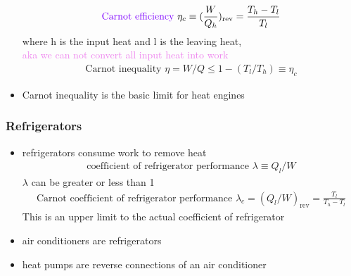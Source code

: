 \begin{itemize}
\begin{align}
		      \text{\textcolor{violet}{Carnot efficiency }} \eta_c \equiv (\frac{W}{Q_h})_\text{rev} = \frac{T_h - T_l}{T_l}
	      \end{align}
	      where h is the input heat and l is the leaving heat, \\
	      \textcolor{violet}{aka we can not convert all input heat into work}
	      \begin{align}
		      \text{Carnot inequality } \eta = W/Q \leq 1 - (T_l/T_h) \equiv \eta_c
	      \end{align}
	\item Carnot inequality is the basic limit for heat engines
\end{itemize}


\subsubsection{Refrigerators}
\begin{itemize}
	\item refrigerators consume work to remove heat
	      \begin{align}
		      \text{coefficient of refrigerator performance } \lambda \equiv Q_l /W
	      \end{align}
	      $\lambda$ can be greater or less than 1
	      \begin{align}
		      \text{Carnot coefficient of refrigerator performance } \lambda_c = (Q_l/W)_\text{rev} = \frac{T_l}{T_h - T_l}
	      \end{align}
	      This is an upper limit to the actual coefficient of refrigerator
	\item air conditioners are refrigerators
	\item heat pumps are reverse connections of an air conditioner
\end{itemize}


